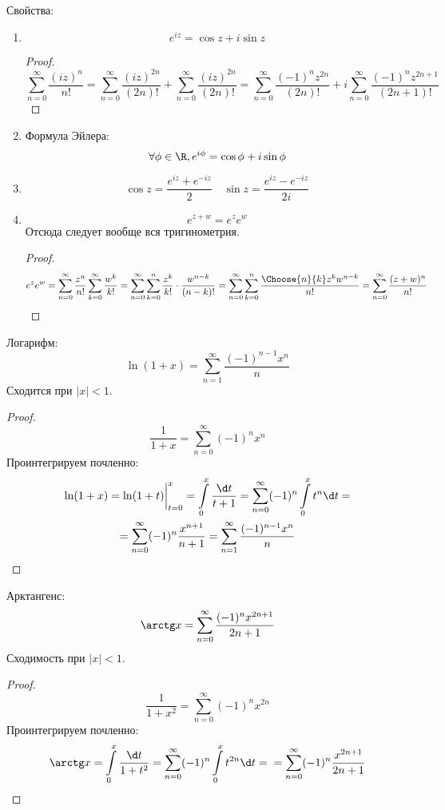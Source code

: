 Свойства:
\begin{enumerate}
\item
	\[ e^{iz} = \cos z + i\sin z \]
	\begin{proof}
		\[
			\sum_{n=0}^\infty \frac{(iz)^n}{n!}
			= \sum_{n=0}^\infty \frac{(iz)^{2n}}{(2n)!} + \sum_{n=0}^\infty \frac{(iz)^{2n}}{(2n)!}
			= \sum_{n=0}^\infty \frac{(-1)^n z^{2n}}{(2n)!} + i \sum_{n=0}^\infty \frac{(-1)^n z^{2n+1}}{(2n+1)!}
		\]
	\end{proof}

\item
	Формула Эйлера:
	\[ \forall \phi \in \R, e^{i\phi} = \cos \phi + i \sin \phi \]

\item
	\[ \cos z = \frac{e^{iz} + e^{-iz}}2 \quad \sin z = \frac{e^{iz} - e^{-iz}}{2i} \]

\item
	\[ e^{z+w} = e^z e^w \]
	Отсюда следует вообще вся тригинометрия.
	\begin{proof}
		\begin{gather*}
			e^z e^w
			= \sum_{n=0}^\infty \frac{z^n}{n!} \sum_{k=0}^\infty \frac{w^k}{k!}
			= \sum_{n=0}^\infty \sum_{k=0}^n \frac{z^k}{k!} \cdot \frac{w^{n-k}}{(n-k)!}
			= \sum_{n=0}^\infty \sum_{k=0}^n \frac{\Choose{n}{k} z^k w^{n-k}}{n!}
			= \sum_{n=0}^\infty \frac{(z+w)^n}{n!}
		\end{gather*}
	\end{proof}
\end{enumerate}

Логарифм:
\[
	\ln (1+x) = \sum_{n=1}^\infty \frac{(-1)^{n-1} x^n}n
\]
Сходится при $|x| < 1$.
\begin{proof}
	\[ \frac1{1+x} = \sum_{n=0}^\infty (-1)^nx^n \]
	Проинтегрируем почленно:
	\begin{gather*}
		\ln (1+x)
		= \ln(1+t) \biggr|_{t=0}^x
		= \int\limits_0^x \frac{\d t}{t + 1}
		= \sum_{n=0}^\infty (-1)^n \int\limits_0^x t^n \d t = \\
		= \sum_{n=0}^\infty (-1)^n \frac{x^{n+1}}{n+1}
		= \sum_{n=1}^\infty \frac{(-1)^{n-1} x^n}n
	\end{gather*}
\end{proof}

Арктангенс:
\[
	\arctg x = \sum_{n=0}^\infty \frac{(-1)^n x^{2n+1}}{2n+1}
\]
Сходимость при $|x| < 1$.
\begin{proof}
	\[ \frac1{1+x^2} = \sum_{n=0}^\infty (-1)^nx^{2n} \]
	Проинтегрируем почленно:
	\[
		\arctg x
		= \int\limits_0^x \frac{\d t}{1 + t^2}
		= \sum_{n=0}^\infty (-1)^n \int\limits_0^x t^{2n} \d t = \\
		= \sum_{n=0}^\infty (-1)^n \frac{x^{2n+1}}{2n+1}
	\]
\end{proof}

